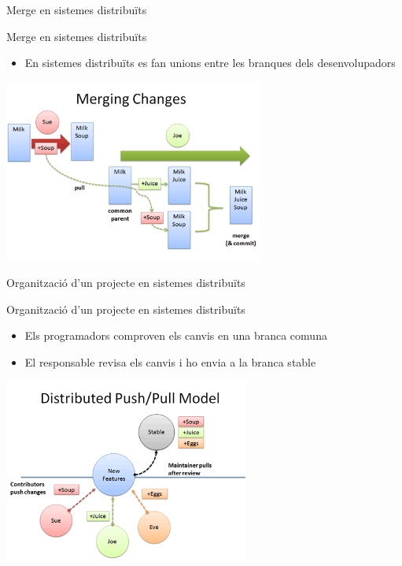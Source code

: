 \documentclass[10pt,xcolor={rgb}]{beamer}
\begin{document}
    \begin{frame}[fragile]{Merge en sistemes distribuïts}
      
            \begin{block}{Merge en sistemes distribuïts}
      
              \begin{itemize}
                \item En sistemes distribuïts es fan unions entre les branques dels desenvolupadors
                
              \end{itemize}

              \centering
              \includegraphics[height=6cm]{distributed_merge.png}
      
            \end{block}
      
    \end{frame}  

    \begin{frame}[fragile]{Organització d'un projecte en sistemes distribuïts}
      
            \begin{block}{Organització d'un projecte en sistemes distribuïts}
      
              \begin{itemize}
                \item Els programadors comproven els canvis en una branca comuna
                \item El responsable revisa els canvis i ho envia a la branca stable
              \end{itemize}

              \centering
              \includegraphics[height=6cm]{distributed_push_pull.png}
      
            \end{block}
      
    \end{frame}  
\end{document}
